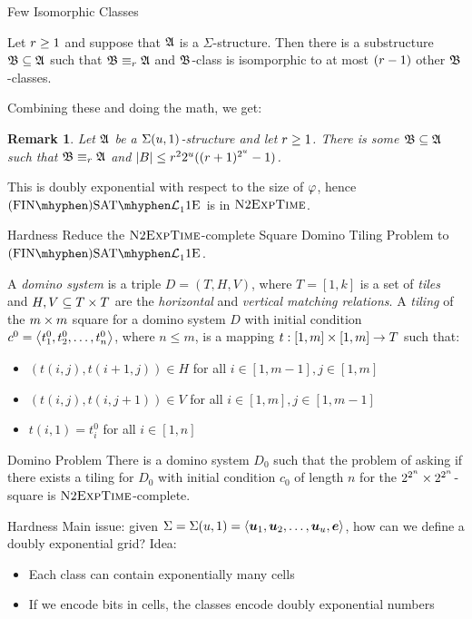 \documentclass{beamer}
\newtheorem{remark}{Remark}
\begin{document}
\begin{frame}{Few Isomorphic Classes}
\begin{lemma}
Let $r \geq 1$ and suppose that $\mathfrak{A}$ is a $\Sigma$-structure.
Then there is a substructure $\mathfrak{B}\subseteq\mathfrak{A}$ such that
$\mathfrak{B}\equiv_{r}\mathfrak{A}$ and $\mathfrak{B}$-class is isomporphic to at most $(r-1)$
other $\mathfrak{B}$-classes.
\end{lemma}

Combining these and doing the math, we get:
\begin{remark}
Let $\mathfrak{A}$ be a $\Sigma(u,1)$-structure and let $r\geq1$.
There is some $\mathfrak{B}\subseteq\mathfrak{A}$ such that $\mathfrak{B}\equiv_{r}\mathfrak{A}$ and
$\left|B\right| \leq r^2 2^u ((r+1)^{2^u}-1)$.
\end{remark}
\pause

This is doubly exponential with respect to the size of $\varphi$, hence
$\FinASat{\Lvp\LL\nonv1\Eea1\noag}$ is in $\text{\normalfont{\scshape N}}2\text{\normalfont{\scshape ExpTime}}$.
\end{frame}

\begin{frame}{Hardness}
Reduce the $\text{\normalfont{\scshape N}}2\text{\normalfont{\scshape ExpTime}}$-complete Square Domino Tiling Problem to
$\FinASat{\Lvp\LL\nonv1\Eea1\noag}$.

A \emph{domino system} is a triple $D = (T,H,V)$, where
$T = [1,k]$ is a set of \emph{tiles} and $H,V\subseteq T\times T$ are the
\emph{horizontal} and \emph{vertical matching relations}.
A \emph{tiling} of the $m\times m$ square for a domino system $D$ with initial
condition $c^0 = \left\langle t_1^0,t_2^0,\dots,t_n^0 \right\rangle$, where $n\leq m$, is a mapping
$t : [1,m]\times [1,m]\to T$ such that:
\begin{itemize}
  \item $(t(i,j),t(i+1,j))\in H$ for all $i\in[1,m-1], j\in[1,m]$
  \item $(t(i,j),t(i,j+1))\in V$ for all $i\in[1,m], j\in[1,m-1]$
  \item $t(i,1) = t_i^0$ for all $i\in[1,n]$
\end{itemize}
\end{frame}

\begin{frame}{Domino Problem}
There is a domino system $D_0$ such that the problem of asking if there exists a
tiling for $D_0$ with initial condition $c_0$ of length $n$ for the
$2^{2^n}\times 2^{2^n}$-square is $\text{\normalfont{\scshape N}}2\text{\normalfont{\scshape ExpTime}}$-complete.
\end{frame}

\begin{frame}{Hardness}
Main issue: given $\Sigma = \Sigma(u,1) = \left\langle \bm{u}_{1},\bm{u}_{2},\dots,\bm{u}_{u},\bm{e} \right\rangle$,
how can we define a doubly exponential grid?
\pause
Idea:
\begin{itemize}
  \item Each class can contain exponentially many cells
  \item If we encode bits in cells, the classes encode doubly exponential
  numbers
\end{itemize}
\end{frame}
\end{document}
